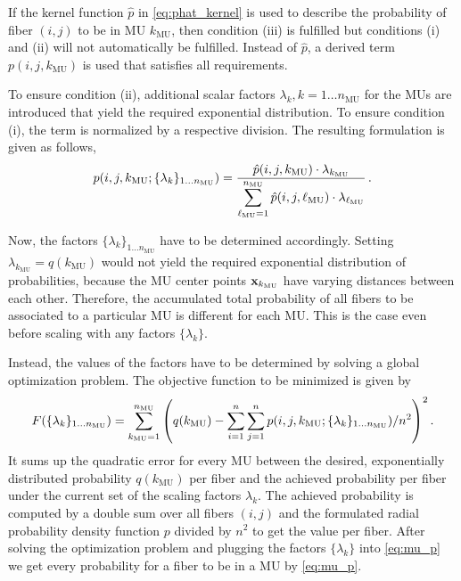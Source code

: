 If the kernel function $\hat{p}$ in \cref{eq:phat_kernel} is used to describe the probability of fiber $(i,j)$ to be in MU $k_\text{MU}$, then condition (iii) is fulfilled but conditions (i) and (ii) will not automatically be fulfilled. Instead of $\hat{p}$, a derived term $p(i,j,k_\text{MU})$ is used that satisfies all requirements.

To ensure condition (ii), additional scalar factors $\lambda_k, k=1\dots n_\text{MU}$ for the MUs are introduced that yield the required exponential distribution.
To ensure condition (i), the term is normalized by a respective division. The resulting formulation is given as follows,
\begin{align}\label{eq:mu_p}
  p(i,j,k_\text{MU};\{\lambda_k\}_{1\dots n_\text{MU}}) = \displaystyle\frac{\displaystyle{\hat{p}(i,j,k_\text{MU}) \cdot \lambda_{k_\text{MU}}}}{\displaystyle{\displaystyle\sum\limits_{\ell_\text{MU}=1}^{n_\text{MU}} \hat{p}(i,j,\ell_\text{MU}) \cdot \lambda_{\ell_\text{MU}}}}\,.
\end{align}

Now, the factors $\{\lambda_k\}_{1\dots n_\text{MU}}$ have to be determined accordingly. Setting $\lambda_{k_\text{MU}} = q(k_\text{MU})$ would not yield the required exponential distribution of probabilities, because the MU center points $\textbf{x}_{k_\text{MU}}$ have varying distances between each other.
Therefore, the accumulated total probability of all fibers to be associated to a particular MU is different for each MU. This is the case even before scaling with any factors $\{\lambda_k\}$.

Instead, the values of the factors have to be determined by solving a global optimization problem.
The objective function to be minimized is given by%
\begin{align}\label{eq:mus_objective}
  F(\{\lambda_k\}_{1\dots n_\text{MU}}) = \displaystyle\sum\limits_{k_\text{MU}=1}^{n_\text{MU}} \left(q(k_\text{MU}) - \displaystyle\sum\limits_{i=1}^{n}\displaystyle\sum\limits_{j=1}^{n}p(i,j,k_\text{MU};\{\lambda_k\}_{1\dots n_\text{MU}}) / n^2\right)^2.
\end{align}
It sums up the quadratic error for every MU between the desired, exponentially distributed probability $q(k_\text{MU})$ per fiber and the achieved probability per fiber under the current set of the scaling factors $\lambda_k$. 
The achieved probability is computed by a double sum over all fibers $(i,j)$ and the formulated radial probability density function $p$ divided by $n^2$ to get the value per fiber.
After solving the optimization problem and plugging the factors $\{\lambda_k\}$ into \cref{eq:mu_p} we get every probability for a fiber to be in a MU by \cref{eq:mu_p}.


